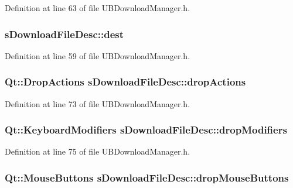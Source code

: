 Definition at line 63 of file U\-B\-Download\-Manager.\-h.

\hypertarget{structs_download_file_desc_aa28d39c1093b42e10e2c521954178fd3}{
\subsubsection[{dest}]{ s\-Download\-File\-Desc\-::dest}}\label{d5/d15/structs_download_file_desc_aa28d39c1093b42e10e2c521954178fd3}


Definition at line 59 of file U\-B\-Download\-Manager.\-h.

\hypertarget{structs_download_file_desc_ac41e67945d6b6da1762155a155e0d18a}{
\subsubsection[{drop\-Actions}]{\setlength{\rightskip}{0pt plus 5cm}Qt\-::\-Drop\-Actions s\-Download\-File\-Desc\-::drop\-Actions}}\label{d5/d15/structs_download_file_desc_ac41e67945d6b6da1762155a155e0d18a}


Definition at line 73 of file U\-B\-Download\-Manager.\-h.

\hypertarget{structs_download_file_desc_ac01c63c05c6449d85ab1eb842a3c1804}{
\subsubsection[{drop\-Modifiers}]{\setlength{\rightskip}{0pt plus 5cm}Qt\-::\-Keyboard\-Modifiers s\-Download\-File\-Desc\-::drop\-Modifiers}}\label{d5/d15/structs_download_file_desc_ac01c63c05c6449d85ab1eb842a3c1804}


Definition at line 75 of file U\-B\-Download\-Manager.\-h.

\hypertarget{structs_download_file_desc_ae81de2ab2b3e04bf4e04e02a85e0026d}{
\subsubsection[{drop\-Mouse\-Buttons}]{\setlength{\rightskip}{0pt plus 5cm}Qt\-::\-Mouse\-Buttons s\-Download\-File\-Desc\-::drop\-Mouse\-Buttons}}\label{d5/d15/structs_download_file_desc_ae81de2ab2b3e04bf4e04e02a85e0026d}


